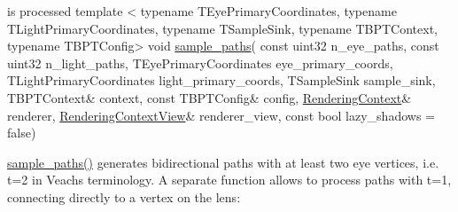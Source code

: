 \begin{DoxyCode}
{       is processed}
\textcolor{keyword}{template} <
  \textcolor{keyword}{typename} TEyePrimaryCoordinates,
  \textcolor{keyword}{typename} TLightPrimaryCoordinates,
  \textcolor{keyword}{typename} TSampleSink,
  \textcolor{keyword}{typename} TBPTContext,
  \textcolor{keyword}{typename} TBPTConfig>
\textcolor{keywordtype}{void} \hyperlink{group___b_p_t_lib_ga4c1164d859ed146eb306e8b7b178c7e7}{sample\_paths}(
   \textcolor{keyword}{const} uint32                n\_eye\_paths,
   \textcolor{keyword}{const} uint32                n\_light\_paths,
   TEyePrimaryCoordinates      eye\_primary\_coords,
   TLightPrimaryCoordinates    light\_primary\_coords,
   TSampleSink                 sample\_sink,
   TBPTContext&                context,
   \textcolor{keyword}{const} TBPTConfig&           config,
   \hyperlink{struct_rendering_context}{RenderingContext}&           renderer,
   \hyperlink{struct_rendering_context_view}{RenderingContextView}&       renderer\_view,
   \textcolor{keyword}{const} \textcolor{keywordtype}{bool}                  lazy\_shadows = \textcolor{keyword}{false})
\end{DoxyCode}


\begin{DoxyParagraph}{}
\hyperlink{group___b_p_t_lib_ga4c1164d859ed146eb306e8b7b178c7e7}{sample\+\_\+paths()} generates bidirectional paths with at least two eye vertices, i.\+e. t=2 in Veach\textquotesingle{}s terminology. A separate function allows to process paths with t=1, connecting directly to a vertex on the lens\+:
\end{DoxyParagraph}
\label{_b_p_t_lib_page_light_tracing_anchor}%
%


